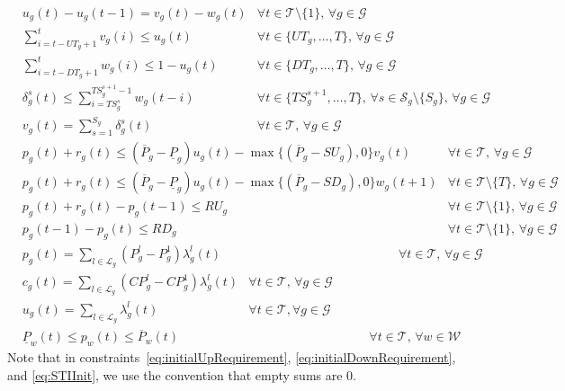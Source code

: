 \documentclass{article}
\newcommand{\cT}{{\mathcal T}}
\newcommand{\cS}{{\mathcal S}}
\newcommand{\cG}{{\mathcal G}}
\newcommand{\cL}{{\mathcal L}}
\newcommand{\cW}{{\mathcal W}}
\newcommand{\uP}{\underline{P}}
\newcommand{\oP}{\overline{P}}
\begin{document}
{\begin{align}
		& u_g(t) - u_g(t-1) = v_g(t) - w_g(t) & \forall t \in \cT\setminus\{1\}, \, \forall g \in \cG \label{eq:Logical} \\
		& \sum_{i= t-UT_g + 1}^t v_g(i) \leq u_g(t) & \forall t \in \{UT_g, \ldots, T\}, \, \forall g \in \cG \label{eq:Startup} \\
		& \sum_{i= t-DT_g + 1}^t w_g(i) \leq 1 - u_g(t) & \forall t \in \{DT_g, \ldots, T\}, \, \forall g \in \cG \label{eq:Shutdown} \\
		& \delta^s_g(t) \leq \sum_{i = TS^s_g}^{TS^{s+1}_g-1} w_g(t-i) & \forall t \in \{TS^{s+1}_g,\ldots,T\},\,\forall s \in \cS_g\!\setminus\!\{S_g\},\,  \forall g \in \cG \label{eq:STISelect} \\
		& v_g(t) = \sum_{s = 1}^{S_g} \delta^s_g(t) & \forall t \in \cT,\, \forall g \in \cG \label{eq:STILink}
		\end{align}
		\begin{align}
		& p_g(t) + r_g(t) \leq (\oP_g - \uP_g) u_g(t) - \max\{(\oP_g - SU_g),0\} v_g(t) & \forall t \in \cT, \, \forall g \in \cG \label{eq:MaxOutput1} \\
		& p_g(t) + r_g(t) \leq (\oP_g - \uP_g) u_g(t) - \max\{(\oP_g - SD_g),0\} w_g(t+1) & \forall t \in \cT\setminus \{T\}, \, \forall g \in \cG \label{eq:MaxOutput2} \\
		& p_g(t) + r_g(t) - p_g(t-1) \leq RU_g & \forall t \in \cT\setminus\{1\}, \, \forall g \in \cG \label{eq:RampUp} \\
		& p_g(t-1) - p_g(t) \leq RD_g & \forall t \in \cT\setminus\{1\}, \, \forall g \in \cG \label{eq:RampDown}
		\end{align}
		\begin{align}
		& p_g(t) = \sum_{l \in \cL_g} (P_g^l - P_g^1) \lambda_g^l(t) &\hspace{5cm} \forall t \in \cT, \, \forall g \in \cG \label{eq:PiecewiseParts} \\
		& c_g(t) = \sum_{l \in \cL_g} (CP_g^l - CP_g^1) \lambda_g^l(t) & \forall t \in \cT, \, \forall g \in \cG \label{eq:PiecewisePartsCost} \\
		& u_g(t) = \sum_{l \in \cL_g} \lambda_g^l(t) & \forall t \in \cT, \forall g \in \cG \label{eq:PiecewiseLimits}
		\end{align}
		\begin{align}
		& \uP_w(t) \leq p_w(t) \leq \oP_w(t) &\hspace{6cm} \forall t \in \cT, \, \forall w \in \cW \label{eq:WindLimit}
		\end{align}
}%
Note that in constraints~\eqref{eq:initialUpRequirement}, \eqref{eq:initialDownRequirement}, and \eqref{eq:STIInit}, we use the convention that empty sums are $0$.
\end{document}
